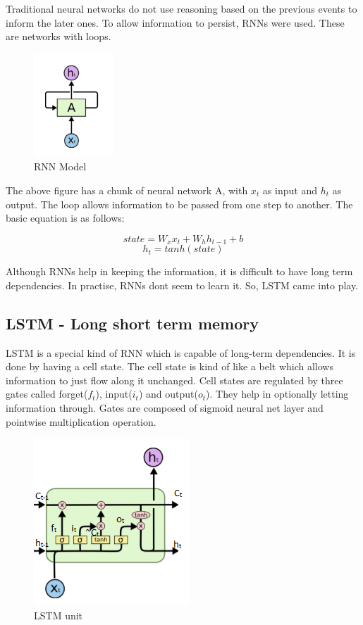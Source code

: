 \documentclass[runningheads]{llncs}
\begin{document}
Traditional neural networks do not use reasoning based on the previous events to inform the later ones. To allow information to persist, RNNs were used. These are networks with loops.

\begin{figure}[h!]
\centering
        \includegraphics[width=0.2\linewidth]{plots/working_rnn}
    \caption{RNN Model}
\end{figure}

The above figure has a chunk of neural network A, with $x_t$ as input and $h_t$ as output. The loop allows information to be passed from one step to another. The basic equation is as follows:

\[state = W_x x_t + W_h h_{t-1} + b \]
\[h_t = tanh(state) \]

Although RNNs help in keeping the information, it is difficult to have long term dependencies. In practise, RNNs dont seem to learn it. So, LSTM came into play.

\subsection{LSTM - Long short term memory}

LSTM is a special kind of RNN which is capable of long-term dependencies. It is done by having a cell state. The cell state is kind of like a belt which allows information to just flow along it unchanged.
Cell states are regulated by three gates called forget($f_t$), input($i_t$) and output($o_t$). They help in optionally letting information through. Gates are composed of sigmoid neural net layer and pointwise multiplication operation.

\begin{figure}[h!]
\centering
        \includegraphics[width=0.4\linewidth]{plots/working_lstm}
    \caption{LSTM unit}
\end{figure}
\end{document}
